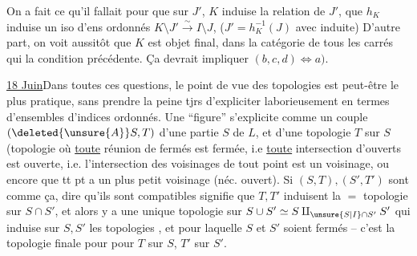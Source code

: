 On a fait ce qu'il fallait pour que sur $J'$, $K$ induise la relation de $J'$, que $h_K$ induise un iso d'ens ordonnés $K\setminus J'\xrightarrow{\sim}I\setminus J$,     ($J'=h_K^{-1}(J)$ avec  induite) D'autre part, on voit
aussitôt que $K$ est objet final, dans la catégorie de tous les carrés 
  qui  la condition précédente. Ça devrait impliquer $(b,c,d)\Longleftrightarrow a)$.

\uline{18 Juin}\quad Dans toutes ces questions, le point de vue des  topologies  est peut-être le plus pratique, sans prendre la peine tjrs d'expliciter laborieusement en termes d'ensembles d'indices ordonnés. Une ``figure''  s'explicite comme un couple $(\deleted{\unsure{A}}S,T)$ d'une partie $S$ de $L$, et d'une topologie $T$ sur $S$ (topologie où \uline{toute} réunion de fermés est fermée, i.e \uline{toute} intersection d'ouverts est ouverte, i.e. l'intersection des voisinages  de tout point est un voisinage, ou encore que tt pt a un plus petit voisinage (néc. ouvert). Si $(S,T),(S',T')$ sont comme ça, dire qu'ils sont compatibles signifie que $T,T'$ induisent la $=$ topologie sur $S\cap S'$,  et alors y a une unique
topologie sur $S\cup S'\simeq S\amalg_{\unsure{S|I}\cap S'}S'$ qui  induise sur $S,S'$ les topologies , et pour laquelle $S$ et $S'$ soient fermés -- c'est la topologie finale pour
pour $T$ sur $S$, $T'$ sur $S'$.

